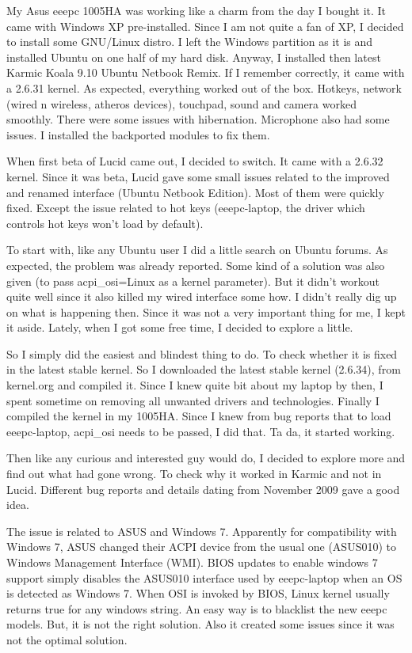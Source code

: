 \vskip 2pt
{\engtext
My Asus eeepc 1005HA was working like a charm from the day I bought it. 
It came with Windows XP pre-installed. Since I am not quite a fan of XP, I 
decided to install some GNU/Linux distro. I left the Windows partition as 
it is and installed Ubuntu on one half of my hard disk. Anyway, I installed 
then latest Karmic Koala 9.10 Ubuntu Netbook Remix. If I remember correctly, 
it came with a 2.6.31 kernel. As expected, everything worked out of the box.
 Hotkeys, network (wired n wireless, atheros devices), touchpad, sound and camera 
worked smoothly. There were some issues with hibernation. Microphone also had some 
issues. I installed the backported modules to fix them.

When first beta of Lucid came out, I decided to switch. It came with a 2.6.32 kernel. 
Since it was beta, Lucid gave some small issues related to the improved and renamed 
interface (Ubuntu Netbook Edition). Most of them were quickly fixed. Except the issue 
related to hot keys (eeepc-laptop, the driver which controls hot keys won't load by default).

To start with, like any Ubuntu user I did a little search on Ubuntu forums. As expected, 
the problem was already reported. Some kind of a solution was also given 
(to pass acpi\_osi=Linux as a kernel parameter). But it didn't workout quite well since 
it also killed my wired interface some how. I didn’t really dig up on what is happening 
then. Since it was not a very important thing for me, I kept it aside. Lately, when I 
got some free time, I decided to explore a little.

So I simply did the easiest and blindest thing to do. To check whether it is fixed in the 
latest stable kernel. So I downloaded the latest stable kernel (2.6.34), from kernel.org 
and compiled it. Since I knew quite bit about my laptop by then, I spent sometime on 
removing all unwanted drivers and technologies. Finally I compiled the kernel in my 1005HA. 
Since I knew from bug reports that to load eeepc-laptop, acpi\_osi needs to be passed, 
I did that. Ta da, it started working.

Then like any curious and interested guy would do, I decided to explore more and find out 
what had gone wrong. To check why it worked in Karmic and not in Lucid. 
Different bug reports and details dating from November 2009 gave a good idea.

The issue is related to ASUS and Windows 7. Apparently for compatibility with Windows 7, 
ASUS changed their ACPI device from the usual one (ASUS010) to Windows Management Interface (WMI). 
BIOS updates to enable windows 7 support simply disables the ASUS010 interface used by eeepc-laptop 
when an OS is detected as Windows 7. When OSI is invoked by BIOS, Linux kernel usually returns true 
for any windows string. An easy way is to blacklist the new eeepc models. But, it is not the right solution. 
Also it created some issues since it was not the optimal solution.

}
